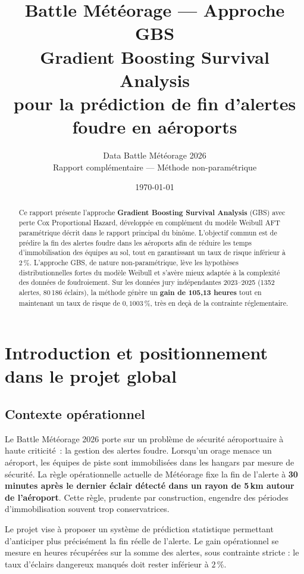 \documentclass[a4paper,11pt]{article}
\title{%
  {\Large\bfseries\color{meteoBlue} Battle Météorage --- Approche GBS}\\[0.4em]
  {\large Gradient Boosting Survival Analysis}\\[0.2em]
  {\normalsize pour la prédiction de fin d'alertes foudre en aéroports}
}
\author{%
  Data Battle Météorage 2026\\[0.2em]
  \small Rapport complémentaire --- Méthode non-paramétrique
}
\date{\today}
\begin{document}
\maketitle
\thispagestyle{fancy}

\begin{abstract}
Ce rapport présente l'approche \textbf{Gradient Boosting Survival Analysis} (GBS) avec perte Cox
Proportional Hazard, développée en complément du modèle Weibull AFT paramétrique décrit dans le
rapport principal du binôme. L'objectif commun est de prédire la fin des alertes foudre dans les
aéroports afin de réduire les temps d'immobilisation des équipes au sol, tout en garantissant un
taux de risque inférieur à $2\,\%$. L'approche GBS, de nature non-paramétrique, lève les hypothèses
distributionnelles fortes du modèle Weibull et s'avère mieux adaptée à la complexité des données
de foudroiement. Sur les données jury indépendantes 2023--2025 (1352 alertes, 80\,186 éclairs),
la méthode génère un \textbf{gain de 105,13 heures} tout en maintenant un taux de risque de
$0{,}1003\,\%$, très en deçà de la contrainte réglementaire.
\end{abstract}

\tableofcontents
\newpage

\section{Introduction et positionnement dans le projet global}

\subsection{Contexte opérationnel}

Le Battle Météorage 2026 porte sur un problème de sécurité aéroportuaire à haute criticité~: la
gestion des alertes foudre. Lorsqu'un orage menace un aéroport, les équipes de piste sont
immobilisées dans les hangars par mesure de sécurité. La règle opérationnelle actuelle de
Météorage fixe la fin de l'alerte à \textbf{30 minutes après le dernier éclair détecté dans un
rayon de 5\,km autour de l'aéroport}. Cette règle, prudente par construction, engendre des
périodes d'immobilisation souvent trop conservatrices.

Le projet vise à proposer un système de prédiction statistique permettant d'anticiper plus
précisément la fin réelle de l'alerte. Le gain opérationnel se mesure en heures récupérées sur la
somme des alertes, sous contrainte stricte : le taux d'éclairs dangereux manqués doit rester
inférieur à $2\,\%$.
\end{document}
